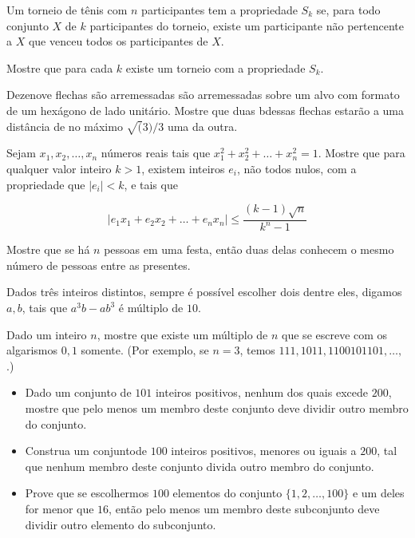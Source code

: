 \begin{questao}
  Um torneio de tênis com $n$ participantes tem a
  propriedade $S_k$ se, para todo conjunto $X$ de $k$
  participantes do torneio, existe um participante não pertencente a
  $X$ que venceu todos os participantes de $X$.

  Mostre que para cada $k$ existe um torneio com a propriedade $S_k$.
\end{questao}

\begin{questao}
  Dezenove flechas são arremessadas são arremessadas sobre
  um alvo com formato de um hexágono de lado unitário. Mostre que duas
  bdessas flechas estarão a uma distância de no máximo $\sqrt(3)/3$
  uma da outra.
\end{questao}

\begin{questao}
  Sejam $x_1,x_2,\ldots,x_n$ números reais tais que
  $x_1^2+x_2^2+\ldots+x_n^2=1$. Mostre que para qualquer valor
  inteiro $k>1$, existem inteiros $e_i$, não todos nulos, com a
  propriedade que $|e_i| < k$, e tais que

  $$|e_1x_1+e_2x_2+\ldots+e_nx_n| \leq \frac{(k-1)\sqrt{n}}{k^n-1}$$
\end{questao}

\begin{questao}
  Mostre que se há $n$ pessoas em uma festa, então duas
  delas conhecem o mesmo número de pessoas entre as presentes.
\end{questao}

\begin{questao}
  Dados três inteiros distintos, sempre é possível escolher
  dois dentre eles, digamos $a,b$, tais que $a^3b-ab^3$ é múltiplo
  de $10$.
\end{questao}

\begin{questao}
  Dado um inteiro $n$, mostre que existe um múltiplo de
  $n$ que se escreve com os algarismos $0,1$ somente. (Por
  exemplo, se $n=3$, temos $111,1011,1100101101,\ldots,$.)
\end{questao}

\begin{questao}
  \begin{itemize}
    \item Dado um conjunto de $101$ inteiros positivos, nenhum dos
    quais excede $200$, mostre que pelo menos um membro deste
    conjunto deve dividir outro membro do conjunto.

    \item Construa um conjuntode $100$ inteiros positivos, menores ou
    iguais a $200$, tal que nenhum membro deste conjunto divida
    outro membro do conjunto.

    \item Prove que se escolhermos $100$ elementos do conjunto
    $\{1,2,\ldots,100\}$ e um deles for menor que $16$, então pelo
    menos um membro deste subconjunto deve dividir outro elemento do subconjunto.
  \end{itemize}
\end{questao}

